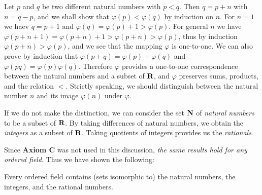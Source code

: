 \documentclass{article}
\begin{document}
Let $p$ and $q$ be two different natural numbers with $p<q$.
Then $q=p+n$ with $n=q-p$,
and we shall show that $\varphi(p) < \varphi(q)$
by induction on $n$.
For $n=1$ we haev $q=p+1$ and $\varphi(q) = \varphi(p) + 1 > \varphi(p)$.
For general $n$ we have $\varphi(p+n+1) = \varphi(p+n) + 1 > \varphi(p+n) > \varphi(p)$,
thus by induction $\varphi(p+n)>\varphi(p)$,
and we see that the mapping $\varphi$ is one-to-one.
We can also prove by induction that $\varphi(p+q) = \varphi(p) + \varphi(q)$ and $\varphi(pq) = \varphi(p) \varphi(q)$.
Therefore $\varphi$ provides a one-to-one correspondence between the natural numbers and a subset of ${\mbox{\bf R}}$,
and $\varphi$ preserves sums, products, and the relation $<$.
Strictly speaking, we should distinguish between the natural number $n$
and its image $\varphi(n)$ under $\varphi$.

If we do not make the distinction,
we can consider the set ${\mbox{\bf N}}$ of \emph{natural numbers} to be a subset of ${\mbox{\bf R}}$.
By taking differences of natural numbers,
we obtain the \emph{integers} as a subset of ${\mbox{\bf R}}$.
Taking quotients of integers provides us the \emph{rationals}.

Since {\bf Axiom C} was not used in this discussion,
\emph{the same results hold for any ordered field}.
Thus we have shown the following:

\begin{proposition}
Every ordered field contains (sets isomorphic to)
the natural numbers,
the integers,
and the rational numbers.
\end{proposition}
\end{document}
